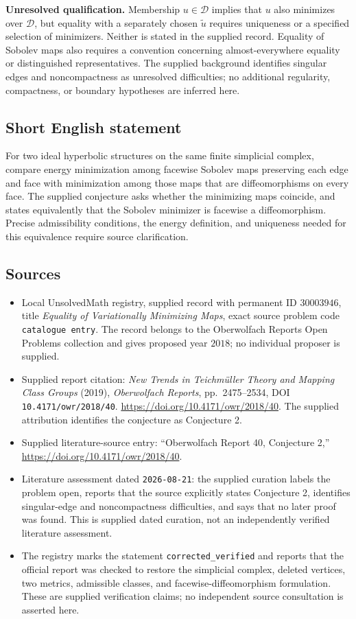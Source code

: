 \documentclass[11pt]{article}
\begin{document}
\textbf{Unresolved qualification.} Membership \(u\in\mathcal D\) implies that \(u\) also minimizes over \(\mathcal D\), but equality with a separately chosen \(\widetilde u\) requires uniqueness or a specified selection of minimizers. Neither is stated in the supplied record. Equality of Sobolev maps also requires a convention concerning almost-everywhere equality or distinguished representatives. The supplied background identifies singular edges and noncompactness as unresolved difficulties; no additional regularity, compactness, or boundary hypotheses are inferred here.
\subsection{Short English statement}
For two ideal hyperbolic structures on the same finite simplicial complex, compare energy minimization among facewise Sobolev maps preserving each edge and face with minimization among those maps that are diffeomorphisms on every face. The supplied conjecture asks whether the minimizing maps coincide, and states equivalently that the Sobolev minimizer is facewise a diffeomorphism. Precise admissibility conditions, the energy definition, and uniqueness needed for this equivalence require source clarification.
\subsection{Sources}
\begin{itemize}
\item Local UnsolvedMath registry, supplied record with permanent ID \(30003946\), title \emph{Equality of Variationally Minimizing Maps}, exact source problem code \texttt{catalogue entry}. The record belongs to the Oberwolfach Reports Open Problems collection and gives proposed year \(2018\); no individual proposer is supplied.
\item Supplied report citation: \emph{New Trends in Teichm\"uller Theory and Mapping Class Groups} (2019), \emph{Oberwolfach Reports}, pp.\ 2475--2534, DOI \texttt{10.4171/owr/2018/40}. \url{https://doi.org/10.4171/owr/2018/40}. The supplied attribution identifies the conjecture as Conjecture 2.
\item Supplied literature-source entry: ``Oberwolfach Report 40, Conjecture 2,'' \url{https://doi.org/10.4171/owr/2018/40}.
\item Literature assessment dated \texttt{2026-08-21}: the supplied curation labels the problem open, reports that the source explicitly states Conjecture 2, identifies singular-edge and noncompactness difficulties, and says that no later proof was found. This is supplied dated curation, not an independently verified literature assessment.
\item The registry marks the statement \texttt{corrected\_verified} and reports that the official report was checked to restore the simplicial complex, deleted vertices, two metrics, admissible classes, and facewise-diffeomorphism formulation. These are supplied verification claims; no independent source consultation is asserted here.
\end{itemize}
\end{document}
